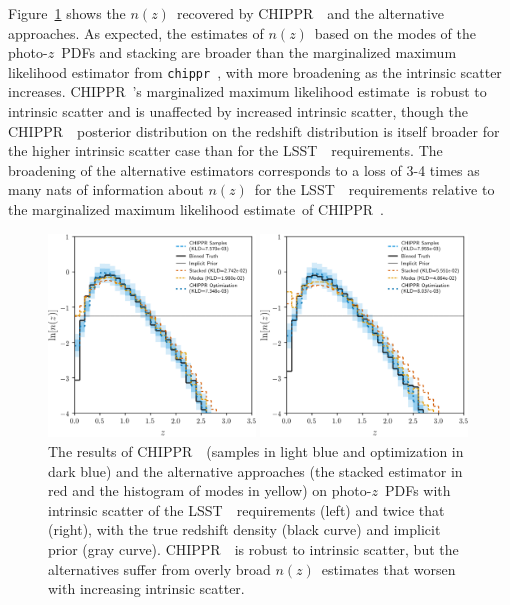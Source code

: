 \documentclass[iop]{emulateapj}
\newcommand{\Fig}[1]{Figure~\ref{#1}}
\newcommand{\project}[1]{{\textsc{#1}}~}
\newcommand{\lsst}{\project{LSST}}
\newcommand{\Chippr}{\project{CHIPPR}}
\newcommand{\repo}[1]{{\texttt{#1}}~}
\newcommand{\chippr}{\repo{chippr}}
\newcommand{\nz}{$n(z)$}
\newcommand{\pz}{photo-$z$~}
\newcommand{\pzpdf}{\pz PDF}
\newcommand{\mmle}{marginalized maximum likelihood estimate}
\begin{document}
\Fig{fig:results-scatter} shows the \nz\ recovered by \Chippr\ and the 
alternative approaches.
As expected, the estimates of \nz\ based on the modes of the \pzpdf s and 
stacking are broader than the marginalized maximum likelihood estimator from 
\chippr, with more broadening as the intrinsic scatter increases.
\Chippr's \mmle\ is robust to intrinsic scatter and is unaffected by increased 
intrinsic scatter, though the \Chippr\ posterior distribution on the redshift 
distribution is itself broader for the higher intrinsic scatter case than for 
the \lsst\ requirements.
The broadening of the alternative estimators corresponds to a loss of 3-4 times 
as many nats of information about \nz\ for the \lsst\ requirements relative to 
the \mmle\ of \Chippr.

\begin{figure}
	
\includegraphics[width=0.49\textwidth]{figures/chippr/results_scatter1.png}
	
\includegraphics[width=0.49\textwidth]{figures/chippr/results_scatter2.png}
	\caption{
		The results of \Chippr\ (samples in light blue and optimization 
in dark blue) and the alternative approaches (the stacked estimator in red and 
the histogram of modes in yellow) on \pzpdf s with intrinsic scatter of the 
\lsst\ requirements (left) and twice that (right), with the true redshift 
density (black curve) and implicit prior (gray curve).
		\Chippr\ is robust to intrinsic scatter, but the alternatives 
suffer from overly broad \nz\ estimates that worsen with increasing intrinsic 
scatter.
	}
	\label{fig:results-scatter}
\end{figure}
\end{document}
